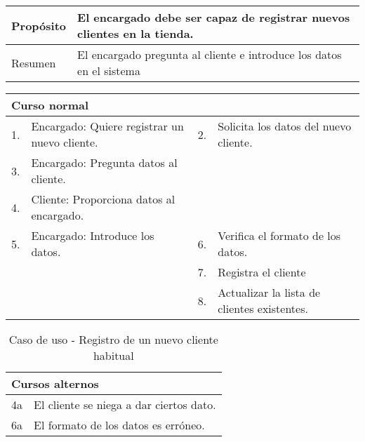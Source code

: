 \begin{table}[H]
	\centering
	\begin{tabular}{| m{} | m{} | m{} | m{} |}
		\hline
		Propósito & \multicolumn{3}{m{0.67\textwidth}|}{El encargado debe ser capaz de registrar nuevos clientes en la tienda.}  \\ 
		\hline
		Resumen & \multicolumn{3}{m{0.67\textwidth}|}{El encargado pregunta al cliente e introduce los datos en el sistema} \\ 
		\hline
	\end{tabular}
\end{table}


\begin{table}[H]
	\centering
	\begin{tabular}{| m{} | m{} | m{} | m{} |}
		\hline
		\multicolumn{4}{|m{0.9\textwidth}|}{Curso normal}     \\ 
		\hline
		1. & Encargado: Quiere registrar un nuevo cliente. & 2. &  Solicita los datos del nuevo cliente.  \\ 
		\hline
		3. & Encargado: Pregunta datos al cliente. &  &   \\ 
		\hline
		4. & Cliente: Proporciona datos al encargado. &  &   \\ 
		\hline
		5. & Encargado: Introduce los datos. & 6. & Verifica el formato de los datos. \\ 
		\hline
		&  & 7. & Registra el cliente \\ 
		\hline
		&  & 8. & Actualizar la lista de clientes existentes. \\ 
		\hline
	\end{tabular}
\end{table}

\begin{table}[H]
	\centering
	\begin{tabular}{| m{} | m{} | m{} | m{} |}
		\hline
		\multicolumn{4}{|m{0.9\textwidth}|}{Cursos alternos}     \\ 
		\hline
		4a & \multicolumn{3}{m{0.67\textwidth}|}{El cliente se niega a dar ciertos dato.} \\ 
		\hline
		6a & \multicolumn{3}{m{0.67\textwidth}|}{El formato de los datos es erróneo.} \\ 
		\hline
	\end{tabular}
	\caption{Caso de uso - Registro de un nuevo cliente habitual}
\end{table}

